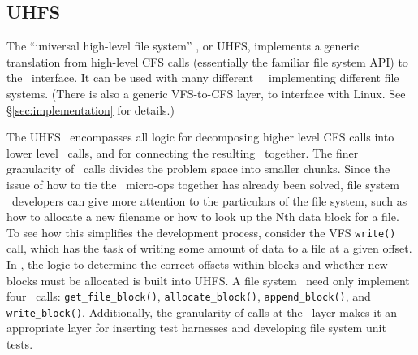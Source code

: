 \subsection{UHFS}
\label{sec:modules:uhfs}

The ``universal high-level file system'' \module, or UHFS, implements a generic
translation from high-level CFS calls (essentially the familiar file system API)
to the \LFS\ interface. It can be used with many different \LFS\ \modules\
implementing different file systems. (There is also a generic VFS-to-CFS layer,
to interface with Linux. See \S\ref{sec:implementation} for details.)

The UHFS \module\ encompasses all logic for decomposing higher level CFS calls
into lower level \LFS\ calls, and for connecting the resulting \chdescs\
together. The finer granularity of \LFS\ calls divides the problem space into
smaller chunks. Since the issue of how to tie the \LFS\ micro-ops together has
already been solved, file system \module\ developers can give more attention to
the particulars of the file system, such as how to allocate a new filename or
how to look up the Nth data block for a file. To see how this simplifies the
development process, consider the VFS \texttt{write()} call, which has the task
of writing some amount of data to a file at a given offset. In \Kudos, the logic
to determine the correct offsets within blocks and whether new blocks must be
allocated is built into UHFS. A file system \module\ need only implement four
\LFS\ calls: \texttt{get\_file\_block()}, \texttt{allocate\_block()},
\texttt{append\_block()}, and \texttt{write\_block()}. Additionally, the
granularity of calls at the \LFS\ layer makes it an appropriate layer for
inserting test harnesses and developing file system unit tests.
